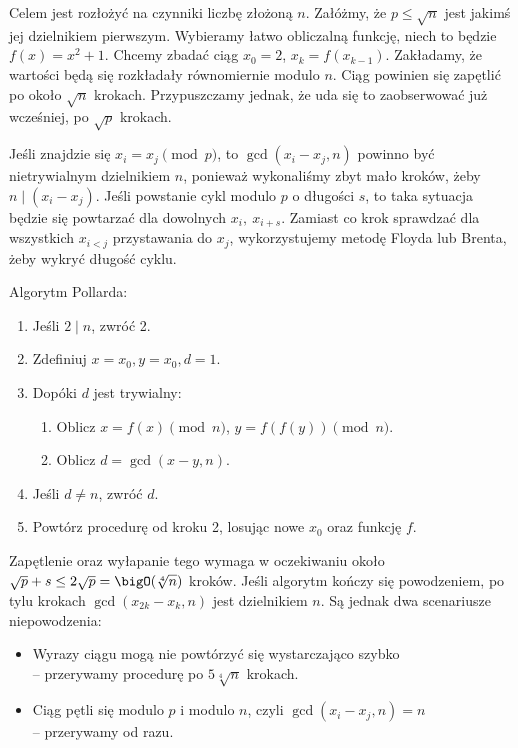 Celem jest rozłożyć na czynniki liczbę złożoną \( n \). Załóżmy, że \( p \leq \sqrt{n} \) jest jakimś jej dzielnikiem pierwszym.
Wybieramy łatwo obliczalną funkcję, niech to będzie \( f(x) = x^2 + 1 \). Chcemy zbadać ciąg \( x_0 = 2 \), \( x_k = f(x_{k-1}) \).
Zakładamy, że wartości będą się rozkładały równomiernie modulo \( n \). Ciąg powinien się zapętlić po około \( \sqrt{n} \) krokach. Przypuszczamy jednak, że uda się to zaobserwować już wcześniej, po \( \sqrt{p} \) krokach.

Jeśli znajdzie się \( x_i = x_j \pmod{p} \), to \( \gcd(x_i - x_j, n) \) powinno być nietrywialnym dzielnikiem \( n \), ponieważ wykonaliśmy zbyt mało kroków, żeby \( n \mid (x_i - x_j) \).
Jeśli powstanie cykl modulo \( p \) o długości \( s \), to taka sytuacja będzie się powtarzać dla dowolnych \( x_i, \ x_{i+s} \). Zamiast co krok sprawdzać dla wszystkich \( x_{i<j} \) przystawania do \( x_j \),
wykorzystujemy metodę Floyda lub Brenta, żeby wykryć długość cyklu.
\begin{greyframe}
    Algorytm Pollarda:
    \begin{enumerate}
        \item Jeśli \( 2 \mid n \), zwróć 2.
        \item Zdefiniuj \( x = x_0, y = x_0, d = 1 \).
        \item Dopóki \( d \) jest trywialny:
        \begin{enumerate}
            \item Oblicz \( x = f(x) \pmod{n} \), \( y = f(f(y)) \pmod{n} \).
            \item Oblicz \( d = \gcd(x-y, n) \).
        \end{enumerate}
        \item Jeśli \( d \neq n \), zwróć \( d \).
        \item Powtórz procedurę od kroku 2, losując nowe \( x_0 \) oraz funkcję \( f \).
    \end{enumerate}
\end{greyframe}
Zapętlenie oraz wyłapanie tego wymaga w oczekiwaniu około \( \sqrt{p} + s \leq 2\sqrt{p} = \bigO(\sqrt[4]{n}) \) kroków. Jeśli algorytm kończy się powodzeniem, po tylu krokach \( \gcd(x_{2k} - x_k, n )\) jest dzielnikiem \( n \).
Są jednak dwa scenariusze niepowodzenia:
\begin{itemize}
    \item Wyrazy ciągu mogą nie powtórzyć się wystarczająco szybko \\
    -- przerywamy procedurę po \( 5\sqrt[4]{n} \) krokach.
    \item Ciąg pętli się modulo \( p \) i modulo \( n \), czyli \( \gcd(x_i - x_j, n) = n \) \\
    -- przerywamy od razu.
\end{itemize}

